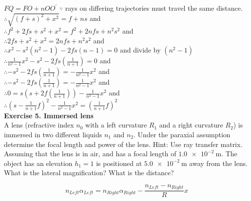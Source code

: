 \documentclass[main.tex]{subfiles}
\begin{document}
$FQ = FO + nOO^{\prime}$ $\because$ rays on differing trajectories must travel the same distance.\\

$\therefore \sqrt{(f+s)^2 + x^2} = f + ns$  and\\ 

$\therefore  f^2+ 2fs + s^2 + x^2 = f^2 + 2nfs + n^2s^2$  and\\ 

$\therefore 2fs + s^2 + x^2 = 2nfs + n^2s^2$  and\\ 

$\therefore x^2  - s^2(n^2 - 1) - 2fs(n- 1) = 0$  and divide by $(n^2 - 1)$ \\ 

$\therefore \frac{1}{n^2 - 1} x^2  - s^2 - 2fs(\frac{1}{n + 1}) = 0$  and \\ 

$\therefore  - s^2 - 2fs(\frac{1}{n + 1}) = -\frac{1}{n^2 - 1} x^2 $  and \\ 

$\therefore  - s^2 - 2fs(\frac{1}{n + 1}) = -\frac{1}{n^2 - 1} x^2 $  and \\ 

$\therefore  0 = s(s + 2f(\frac{1}{n + 1})) -\frac{1}{n^2 - 1} x^2 $  and \\

$\therefore \left(s-\frac{1}{n+1}f \right)^2 - \frac{1}{n^2 - 1}x^2 = \left(\frac{1}{n+1}f \right)^2$ \\

\textbf{Exercise 5. Immersed lens}\\

 A lens (refractive index $n_0$ with a left curvature $R_1$ and a right curvature $R_2$) is immersed in two different liquids $n_1$ and $n_2$. Under the paraxial assumption determine the focal length and power of the lens. Hint: Use ray transfer matrix. Assuming that the lens is in air, and has a focal length of $\SI{1.0e-2}{\meter}$. The object has an elevation $h_1=1$ is positioned at $\SI{5.0e-2}{\meter}$ away from the lens. What is the lateral magnification? What is the distance?


\begin{equation}\label{eq:5a}
n_{Left} \alpha_{Left} = n_{Right} \alpha_{Right} - \frac{n_{Left} - n_{Right}}{R}x
\end{equation}
\end{document}

